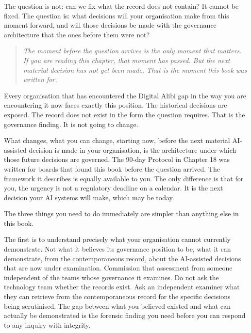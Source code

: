 The question is not: can we fix what the record does not contain? It cannot be fixed. The question is: what decisions will your organisation make from this moment forward, and will those decisions be made with the governance architecture that the ones before them were not?

\begin{quote}
\emph{The moment before the question arrives is the only moment that matters. If you are reading this chapter, that moment has passed. But the next material decision has not yet been made. That is the moment this book was written for.}
\end{quote}

Every organisation that has encountered the Digital Alibi gap in the way you are encountering it now faces exactly this position. The historical decisions are exposed. The record does not exist in the form the question requires. That is the governance finding. It is not going to change.

What changes, what you can change, starting now, before the next material AI-assisted decision is made in your organisation, is the architecture under which those future decisions are governed. The 90-day Protocol in Chapter 18 was written for boards that found this book before the question arrived. The framework it describes is equally available to you. The only difference is that for you, the urgency is not a regulatory deadline on a calendar. It is the next decision your AI systems will make, which may be today.

The three things you need to do immediately are simpler than anything else in this book.

The first is to understand precisely what your organisation cannot currently demonstrate. Not what it believes its governance position to be, what it can demonstrate, from the contemporaneous record, about the AI-assisted decisions that are now under examination. Commission that assessment from someone independent of the teams whose governance it examines. Do not ask the technology team whether the records exist. Ask an independent examiner what they can retrieve from the contemporaneous record for the specific decisions being scrutinised. The gap between what you believed existed and what can actually be demonstrated is the forensic finding you need before you can respond to any inquiry with integrity.

